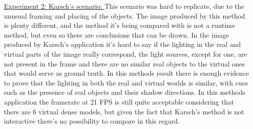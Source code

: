 \underline{Experiment 2: Karsch's scenario: } This scenario was hard to replicate, due to the unusual framing and placing of the objects. The image produced by this method is plenty different, and the method it's being compared with is not a runtime method, but even so there are conclusions that can be drawn. In the image produced by Karsch's application it's hard to say if the lighting in the real and virtual parts of the image really correspond, the light sources, except for one, are not present in the frame and there are no similar real objects to the virtual ones that would serve as ground truth. In this methods result there is enough evidence to prove that the lighting in both the real and virtual worlds is similar, with cues such as the presence of real objects and their shadow directions.\newline
In this methods application the framerate at 21 FPS is still quite acceptable considering that there are 6 virtual dense models, but given the fact that Karsch's method is not interactive there's no possibility to compare in this regard.
